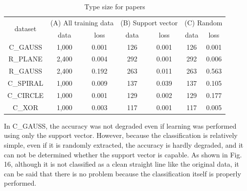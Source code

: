 \begin{table}[b]
\begin{center}
\begin{threeparttable}
\caption{Type size for papers}
\begin{tabular}{|c|c|c|c|c|c|c|} \hline
\multirow{2}{*}{dataset} & \multicolumn{2}{|c}{(A) All training data} & \multicolumn{2}{|c}{(B) Support vector} & \multicolumn{2}{|c|}{(C)  Random} \\ \cline{2-7}

 & data & loss & data & loss & data & loss \\ \hline\hline
C\_GAUSS & 1,000 & 0.001 & 126 & 0.001 & 126 & 0.001 \\ \hline
R\_PLANE & 2,400 & 0.004 & 292 & 0.001 & 292 & 0.006 \\ \hline
R\_GAUSS & 2,400 & 0.192 & 263 & 0.011 & 263 & 0.563 \\ \hline
C\_SPIRAL & 1,000 & 0.009 & 137 & 0.039 & 137 & 0.105 \\ \hline
C\_CIRCLE & 1,000 & 0.001 & 129 & 0.002 & 129 & 0.177 \\ \hline
C\_XOR & 1,000 & 0.003 & 117 & 0.001 & 117 & 0.005 \\ \hline
\end{tabular}
\end{threeparttable}
\end{center}
\end{table}


In C\_GAUSS, the accuracy was not degraded even if learning was performed using only the support vector. However, because the classification is relatively simple, even if it is randomly extracted, the accuracy is hardly degraded, and it can not be determined whether the support vector is capable. As shown in Fig. 16, although it is not classified as a clean straight line like the original data, it can be said that there is no problem because the classification itself is properly performed.

